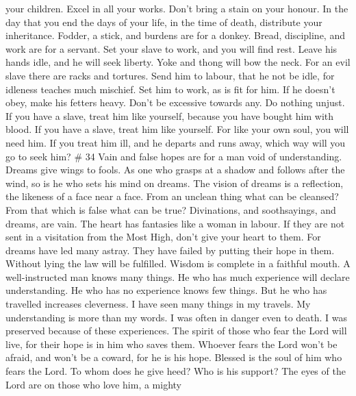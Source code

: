 your children.  Excel in all your works. Don't bring a
stain on your honour.  In the day that you end the days of
your life, in the time of death, distribute your inheritance.
 Fodder, a stick, and burdens are for a donkey. Bread,
discipline, and work are for a servant.  Set your slave to
work, and you will find rest. Leave his hands idle, and he will seek
liberty.  Yoke and thong will bow the neck. For an evil
slave there are racks and tortures.  Send him to labour,
that he not be idle, for idleness teaches much mischief. 
Set him to work, as is fit for him. If he doesn't obey, make his fetters
heavy.  Don't be excessive towards any. Do nothing unjust.
 If you have a slave, treat him like yourself, because you
have bought him with blood.  If you have a slave, treat him
like yourself. For like your own soul, you will need him. If you treat
him ill, and he departs and runs away,  which way will you
go to seek him? \# 34  Vain and false hopes are for a man
void of understanding. Dreams give wings to fools.  As one
who grasps at a shadow and follows after the wind, so is he who sets his
mind on dreams.  The vision of dreams is a reflection, the
likeness of a face near a face.  From an unclean thing what
can be cleansed? From that which is false what can be true? 
Divinations, and soothsayings, and dreams, are vain. The heart has
fantasies like a woman in labour.  If they are not sent in a
visitation from the Most High, don't give your heart to them.
 For dreams have led many astray. They have failed by
putting their hope in them.  Without lying the law will be
fulfilled. Wisdom is complete in a faithful mouth.  A
well-instructed man knows many things. He who has much experience will
declare understanding.  He who has no experience knows few
things. But he who has travelled increases cleverness.  I
have seen many things in my travels. My understanding is more than my
words.  I was often in danger even to death. I was
preserved because of these experiences.  The spirit of
those who fear the Lord will live, for their hope is in him who saves
them.  Whoever fears the Lord won't be afraid, and won't be
a coward, for he is his hope.  Blessed is the soul of him
who fears the Lord. To whom does he give heed? Who is his support?
 The eyes of the Lord are on those who love him, a mighty
